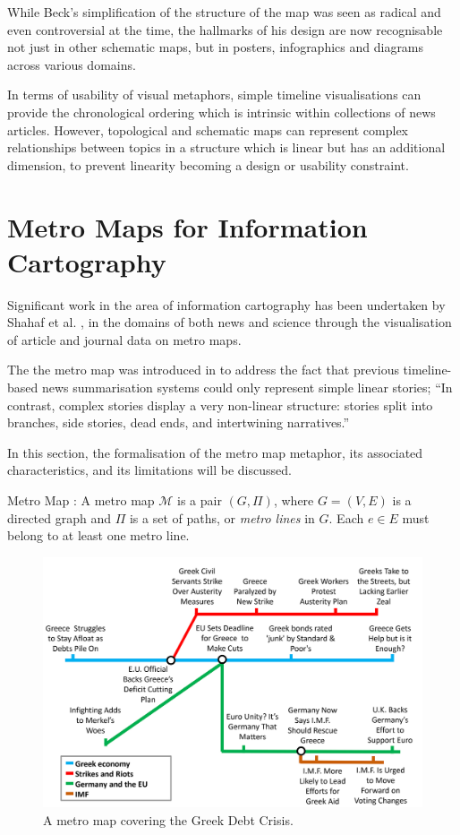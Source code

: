 While Beck's simplification of the structure of the map was seen as radical and even controversial at the time, the hallmarks of his design are now recognisable not just in other schematic maps, but in posters, infographics and diagrams across various domains.

In terms of usability of visual metaphors, simple timeline visualisations can provide the chronological ordering which is intrinsic within collections of news articles. However, topological and schematic maps can represent complex relationships between topics in a structure which is linear but has an additional dimension, to prevent linearity becoming a design or usability constraint.

\section{Metro Maps for Information Cartography}
Significant work in the area of information cartography has been undertaken by Shahaf et al. \citep{ConnectingTheDots, GeneratingInformationMaps, MetroMapsOfScience, InformationCartographyPre}, in the domains of both news and science through the visualisation of article and journal data on metro maps.

The the metro map was introduced in \citep{GeneratingInformationMaps} to address the fact that previous timeline-based news summarisation systems could only represent simple linear stories; ``In contrast, complex stories display a very non-linear structure: stories split into branches, side stories, dead ends, and intertwining narratives.'' \citep[p.1]{InformationCartographyPre}

In this section, the formalisation of the metro map metaphor, its associated characteristics, and its limitations will be discussed.

\begin{definition}{Metro Map \citep{GeneratingInformationMaps}:}
A metro map $\mathcal{M}$ is a pair $(G, \Pi)$, where $G=(V, E)$ is a directed graph and $\Pi$ is a set of paths, or \textit{metro lines} in $G$. Each $e \in E$ must belong to at least one metro line.
\end{definition}

\begin{figure}[htbp!]
	\centering
	\includegraphics[width=.9\textwidth]{img/lit-survey/greece-metromap.jpg}
	\caption{A metro map \citep{GeneratingInformationMaps} covering the Greek Debt Crisis.}
	\label{fig:greecemetro}
\end{figure}

